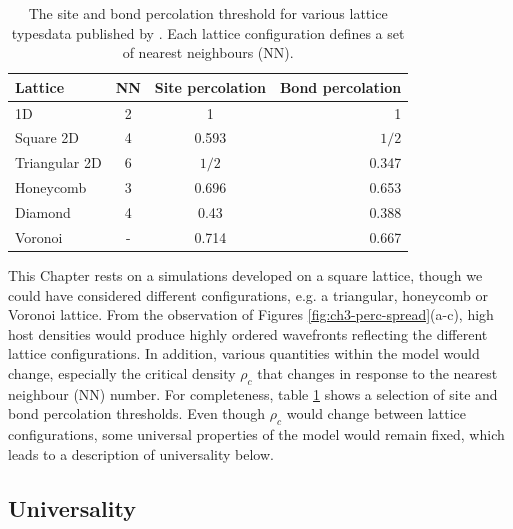 \begin{table}[h!]
  \begin{center}
    \begin{tabular}{l|c|c|r} %
    \hline
      \textbf{Lattice} & NN & \textbf{Site percolation} & \textbf{Bond percolation}\\
      \hline
      1D & 2 & 1 & 1\\
      Square 2D & 4 & 0.593 & $1/2$\\
      Triangular 2D & 6 & $1/2$ & 0.347\\
      Honeycomb & 3 & 0.696 & 0.653\\
      Diamond & 4 & 0.43 & 0.388\\
      Voronoi & - & 0.714 & 0.667\\
    \hline
    \end{tabular}
    \caption{The site and bond percolation threshold for various lattice types\textemdash data published by \cite{stauffer2018introduction, PhysRevE.80.041101}.
            Each lattice configuration defines a set of nearest neighbours (NN).
    }
    \label{tab:perc}
  \end{center}
\end{table}

This Chapter rests on a simulations developed on a square lattice, though we could have considered different configurations, e.g. a triangular, honeycomb or Voronoi lattice.
From the observation of Figures \ref{fig:ch3-perc-spread}(a-c), high host densities would produce highly ordered wavefronts reflecting the different lattice configurations.
In addition, various quantities within the model would change, especially the critical density $\rho_c$ that changes in response to the nearest neighbour (NN) number.
For completeness, table \ref{tab:perc} shows a selection of site and bond percolation thresholds.
Even though $\rho_c$ would change between lattice configurations, some universal properties of the model would remain fixed, 
which leads to a description of universality below.

\subsection{Universality}

